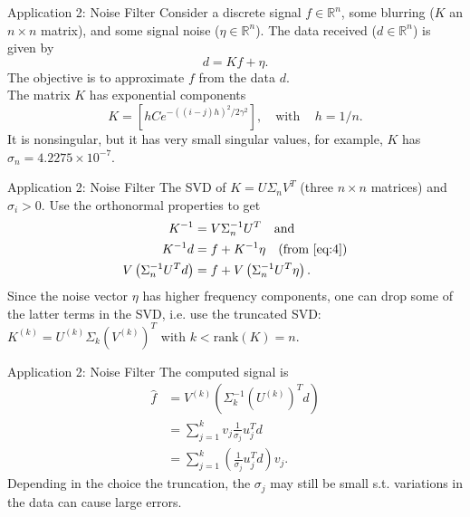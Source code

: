 \documentclass[aspectratio=169,xcolor=dvipsnames]{beamer}
\begin{document}
\begin{frame}{Application 2: Noise Filter}
 Consider a discrete signal $f
 \in \mathbb{R}^{n}$, some blurring ($K$ an $n\times n$ matrix), and some signal noise ($\eta \in \mathbb{R}^{n}$). The data received ($d\in \mathbb{R}^{n}$) is given by
 \begin{equation}
     d = K f + \eta .
     \label{eq:4}
 \end{equation}
 The objective is to approximate $f$ from the data $d$. \\
 The matrix $K$ has exponential components
 \begin{equation*}
     K = \left[ h Ce^{-((i-j)h)^2 / 2 \gamma^2 }\right] , \quad \text{with} \quad \, h=1/n .
 \end{equation*}
 It is nonsingular, but it has very small singular values, for example, $K$ has $\sigma_n = 4.2275 \times 10^{-7}$.
\end{frame}

\begin{frame}{Application 2: Noise Filter}
    The SVD of $K=U\Sigma_n V^T$ (three $n\times n$ matrices) and $\sigma_i > 0$. Use the orthonormal properties to get
    \begin{align*}
        K^{-1} &= V \Sigma_n^{-1} U^T \quad \text{and}\\
        K^{-1} d &= f + K^{-1} \eta \quad\text{(from \eqref{eq:4})}\\
        V\left( \Sigma^{-1}_n U^T d\right) &= f + V \left( \Sigma^{-1}_n U^{T} \eta \right) .
    \end{align*}
   Since the noise vector $\eta$ has higher frequency components, one can drop some of the latter terms in the SVD, i.e. use the truncated SVD: $K^{(k)} = U^{(k)} \Sigma_k \left( V^{(k)}\right)^T$ with $k< \text{rank}(K) = n$. 
\end{frame}

\begin{frame}{Application 2: Noise Filter}
    The computed signal is
    \begin{align*}
        \hat{f} &= V^{(k)} \left( \Sigma^{-1}_{k} \left( U^{(k)}\right)^T d \right)\\
        &= \sum^{k}_{j=1} v_j \frac{1}{\sigma_j} u^T_j d \\
        &= \sum^{k}_{j=1} \left( \frac{1}{\sigma_j} u^T_{j} d\right) v_j .
    \end{align*}
    Depending in the choice the truncation, the $\sigma_j$ may still be small s.t. variations in the data can cause large errors. 
\end{frame}
\end{document}
